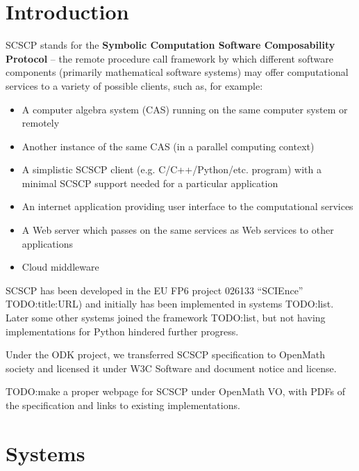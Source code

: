 \documentclass{deliverablereport}
\author{ }
\begin{document}
\maketitle
%
\strut\githubissuedescription
\newpage\tableofcontents\newpage

\section{Introduction}\label{intro}

{\sf SCSCP} stands for the 
{\bf Symbolic Computation Software Composability Protocol}
-- the remote procedure call framework by which different
software components (primarily mathematical software systems) 
may offer computational services to a variety of possible
clients, such as, for example:
\begin{itemize}
\item A computer algebra system (CAS) running on the same computer system or remotely
\item Another instance of the same CAS (in a parallel computing context)
\item A simplistic SCSCP client (e.g. C/C++/Python/etc. program) with a minimal 
SCSCP support needed for a particular application
\item An internet application providing user interface to the computational services
\item A Web server which passes on the same services as Web services to other applications
\item Cloud middleware
\end{itemize}

SCSCP has been developed in the EU FP6 project 026133 
``SCIEnce'' TODO:title:URL) and initially has been
implemented in systems TODO:list. Later some other systems
joined the framework TODO:list, but not having implementations
for Python hindered further progress. 

Under the ODK project, we transferred SCSCP specification
to OpenMath society and licensed it under
W3C Software and document notice and license.

TODO:make a proper webpage for SCSCP under OpenMath VO, with
PDFs of the specification and links to existing implementations.


\section{Systems}\label{systems}
\end{document}
